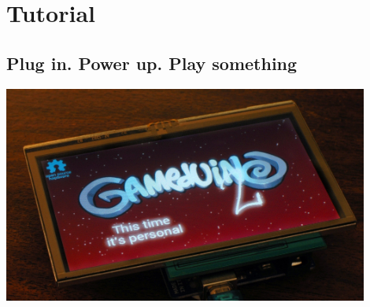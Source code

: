 \documentclass[10pt]{book}
\begin{document}
\vfill


\endgroup

\thispagestyle{empty}
\pagestyle{headings}

\tableofcontents

\part{Tutorial}

\chapter{Plug in. Power up. Play something}

\begin{center}
\includegraphics[width=0.9\textwidth]{plugin.jpg}
\end{center}
\end{document}
